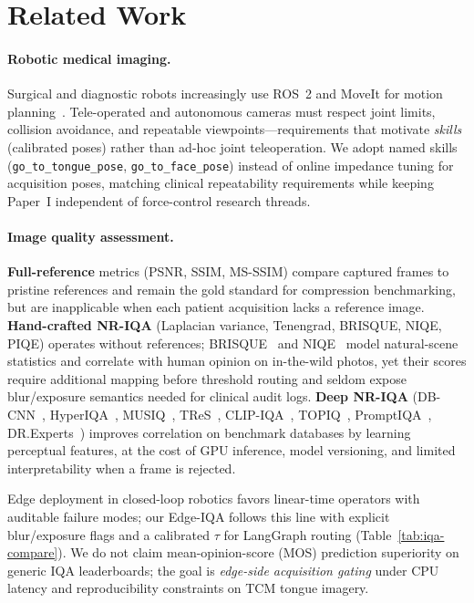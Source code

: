 \section{Related Work}
\label{sec:related}

\paragraph{Robotic medical imaging.}
Surgical and diagnostic robots increasingly use ROS~2 and MoveIt for motion planning~\cite{moore2021ros2,chitta2009moveit}.
Tele-operated and autonomous cameras must respect joint limits, collision avoidance, and repeatable viewpoints---requirements that motivate \emph{skills} (calibrated poses) rather than ad-hoc joint teleoperation.
We adopt named skills (\texttt{go\_to\_tongue\_pose}, \texttt{go\_to\_face\_pose}) instead of online impedance tuning for acquisition poses, matching clinical repeatability requirements while keeping Paper~I independent of force-control research threads.

\paragraph{Image quality assessment.}
\textbf{Full-reference} metrics (PSNR, SSIM, MS-SSIM) compare captured frames to pristine references and remain the gold standard for compression benchmarking, but are inapplicable when each patient acquisition lacks a reference image.
\textbf{Hand-crafted NR-IQA} (Laplacian variance, Tenengrad, BRISQUE, NIQE, PIQE) operates without references; BRISQUE~\cite{mittal2012brisque} and NIQE~\cite{mittal2012niqe} model natural-scene statistics and correlate with human opinion on in-the-wild photos, yet their scores require additional mapping before threshold routing and seldom expose blur/exposure semantics needed for clinical audit logs.
\textbf{Deep NR-IQA} (DB-CNN~\cite{zhang2018blind}, HyperIQA~\cite{su2020hyperiqa}, MUSIQ~\cite{ke2021musiq}, TReS~\cite{golestaneh2022tres}, CLIP-IQA~\cite{wang2023clipiqa}, TOPIQ~\cite{chen2024topiq}, PromptIQA~\cite{chen2024promptiqa}, DR.Experts~\cite{fu2026dr.experts}) improves correlation on benchmark databases by learning perceptual features, at the cost of GPU inference, model versioning, and limited interpretability when a frame is rejected.

Edge deployment in closed-loop robotics favors linear-time operators with auditable failure modes; our Edge-IQA follows this line with explicit blur/exposure flags and a calibrated $\tau$ for LangGraph routing (Table~\ref{tab:iqa-compare}).
We do not claim mean-opinion-score (MOS) prediction superiority on generic IQA leaderboards; the goal is \emph{edge-side acquisition gating} under CPU latency and reproducibility constraints on TCM tongue imagery.

